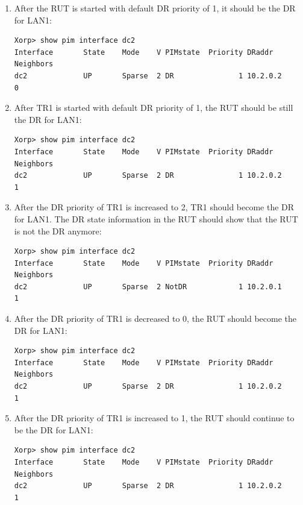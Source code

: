 \documentclass[11pt]{report}
\begin{document}
\begin{enumerate}

  \item After the RUT is started with default DR priority of 1, it should
        be the DR for LAN1:

\begin{verbatim}
Xorp> show pim interface dc2
Interface       State    Mode    V PIMstate  Priority DRaddr      Neighbors
dc2             UP       Sparse  2 DR               1 10.2.0.2            0
\end{verbatim}

  \item After TR1 is started with default DR priority of 1, the RUT should be
        still the DR for LAN1:

\begin{verbatim}
Xorp> show pim interface dc2
Interface       State    Mode    V PIMstate  Priority DRaddr      Neighbors
dc2             UP       Sparse  2 DR               1 10.2.0.2            1
\end{verbatim}

  \item After the DR priority of TR1 is increased to 2, TR1 should become the
  DR for LAN1. The DR state information in the RUT should show that the RUT is
  not the DR anymore:

\begin{verbatim}
Xorp> show pim interface dc2
Interface       State    Mode    V PIMstate  Priority DRaddr      Neighbors
dc2             UP       Sparse  2 NotDR            1 10.2.0.1            1
\end{verbatim}

  \item After the DR priority of TR1 is decreased to 0, the RUT should become
        the DR for LAN1:

\begin{verbatim}
Xorp> show pim interface dc2
Interface       State    Mode    V PIMstate  Priority DRaddr      Neighbors
dc2             UP       Sparse  2 DR               1 10.2.0.2            1
\end{verbatim}

  \item After the DR priority of TR1 is increased to 1, the RUT should
        continue to be the DR for LAN1: 

\begin{verbatim}
Xorp> show pim interface dc2
Interface       State    Mode    V PIMstate  Priority DRaddr      Neighbors
dc2             UP       Sparse  2 DR               1 10.2.0.2            1
\end{verbatim}


\end{enumerate}
\end{document}
